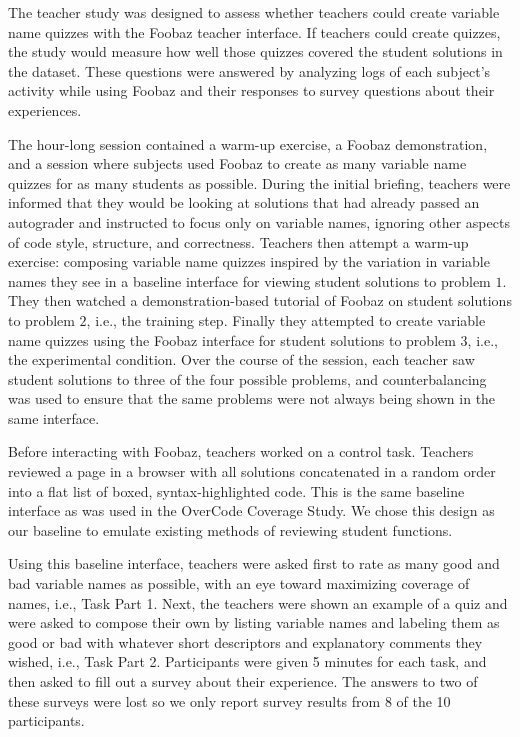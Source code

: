 The teacher study was designed to assess whether teachers could create variable name quizzes with the Foobaz teacher interface. If teachers could create quizzes, the study would measure how well those quizzes covered the student solutions in the dataset. These questions were answered by analyzing logs of each subject's activity while using Foobaz and their responses to survey questions about their experiences.

The hour-long session contained a warm-up exercise, a Foobaz demonstration, and a session where subjects used Foobaz to create as many variable name quizzes for as many students as possible. During the initial briefing, teachers were informed that they would be looking at solutions that had already passed an autograder and instructed to focus only on variable names, ignoring other aspects of code style, structure, and correctness. Teachers then attempt a warm-up exercise: composing variable name quizzes inspired by the variation in variable names they see in a baseline interface for viewing student solutions to problem $1$. They then watched a demonstration-based tutorial of Foobaz on student solutions to problem $2$, i.e., the training step. Finally they attempted to create variable name quizzes using the Foobaz interface for student solutions to problem $3$, i.e., the experimental condition. Over the course of the session, each teacher saw student solutions to three of the four possible problems, and counterbalancing was used to ensure that the same problems were not always being shown in the same interface. 


Before interacting with Foobaz, teachers worked on a control task. Teachers reviewed a page in a browser with all solutions concatenated in a random order into a flat list of boxed, syntax-highlighted code. This is the same baseline interface as was used in the OverCode Coverage Study. We chose this design as our baseline to emulate existing methods of reviewing student functions. 

Using this baseline interface, teachers were asked first to rate as many good and bad variable names as possible, with an eye toward maximizing coverage of names, i.e., Task Part 1. Next, the teachers were shown an example of a quiz and were asked to compose their own by listing variable names and labeling them as good or bad with whatever short descriptors and explanatory comments they wished, i.e., Task Part 2. Participants were given 5 minutes for each task, and then asked to fill out a survey about their experience. The answers to two of these surveys were lost so we only report survey results from 8 of the 10 participants. 

